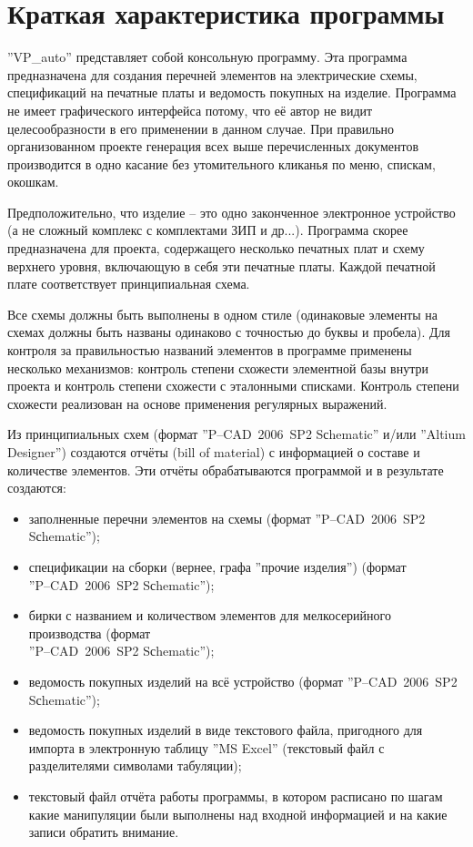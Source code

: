
\section{Краткая характеристика программы} 
''VP\_auto'' представляет собой консольную программу. Эта программа предназначена для создания перечней элементов на электрические схемы, спецификаций на печатные платы и ведомость покупных на изделие. Программа не имеет графического интерфейса потому, что её автор не видит целесообразности в его применении в данном случае. При правильно организованном проекте генерация всех выше перечисленных документов производится в одно касание без утомительного кликанья по меню, спискам, окошкам.

Предположительно, что изделие -- это одно законченное электронное устройство (а не сложный комплекс с комплектами ЗИП и др...). Программа скорее предназначена для проекта, содержащего несколько печатных плат и схему верхнего уровня, включающую в себя эти печатные платы. Каждой печатной плате соответствует принципиальная схема. 

Все схемы должны быть выполнены в одном стиле (одинаковые элементы на схемах должны быть названы одинаково с точностью до буквы и пробела). Для контроля за правильностью названий элементов в программе применены несколько механизмов: контроль степени схожести элементной базы внутри проекта и контроль степени схожести с эталонными списками. Контроль степени схожести реализован на основе применения регулярных выражений.

Из принципиальных схем (формат ''P--CAD~2006~SP2 Sсhematic'' и/или ''Altium Designer'') создаются отчёты (bill of material) с информацией о составе и количестве элементов. Эти отчёты обрабатываются программой и в результате создаются:
\begin{itemize}
  \item  заполненные перечни элементов на схемы (формат ''P--CAD~2006~SP2 \\Sсhematic'');
  \item  спецификации на сборки (вернее, графа ''прочие изделия'') (формат \\''P--CAD~2006~SP2 Sсhematic'');
  \item  бирки с названием и количеством элементов для мелкосерийного производства (формат \\''P--CAD~2006~SP2 Sсhematic'');  
  \item  ведомость покупных изделий на всё устройство (формат ''P--CAD~2006~SP2 \\Sсhematic'');
  \item  ведомость покупных изделий в виде текстового файла, пригодного для импорта в электронную таблицу ''MS Excel'' (текстовый файл с разделителями символами табуляции);
  \item  текстовый файл отчёта работы программы, в котором расписано по шагам какие манипуляции были выполнены над входной информацией и на какие записи обратить внимание.
\end{itemize}

